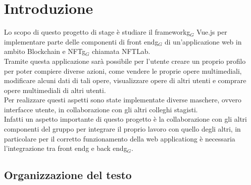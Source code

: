 
\chapter{Introduzione}
\label{cap:introduzione}

Lo scopo di questo progetto di stage è studiare il \gls{frameworkg}$_G$ Vue.js per implementare parte delle componenti di \gls{front endg}$_G$ di un'applicazione web in ambito Blockchain e \gls{NFTg}$_G$ chiamata NFTLab. \\
Tramite questa applicazione sarà possibile per l'utente creare un proprio profilo per poter compiere diverse azioni, come vendere le proprie opere multimediali, modificare alcuni dati di tali opere, visualizzare opere di altri utenti e comprare opere multimediali di altri utenti. \\
Per realizzare questi aspetti sono state implementate diverse maschere, ovvero interfacce utente, in collaborazione con gli altri colleghi stagisti.\\
Infatti un aspetto importante di questo progetto è la collaborazione con gli altri componenti del gruppo per integrare il proprio lavoro con quello degli altri, in particolare per il corretto funzionamento della \gls{web applicationg} è necessaria l'integrazione tra \gls{front endg} e \gls{back endg}$_G$.


\section{Organizzazione del testo}
\label{sec:organizzazione-testo}

